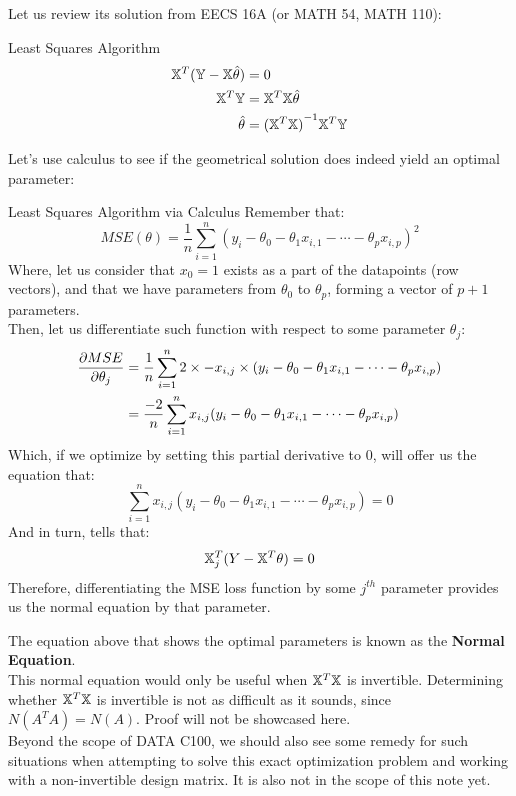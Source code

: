 Let us review its solution from EECS 16A (or MATH 54, MATH 110):
\begin{ln-derive}{Least Squares Algorithm}{}
    \begin{align*}
        \mathbb{X}^T (\mathbb{Y} - \mathbb{X} \hat{\theta}) &= 0 \\
        \mathbb{X}^T\mathbb{Y} &= \mathbb{X}^T\mathbb{X} \hat{\theta} \\
        \hat{\theta} &= {(\mathbb{X}^T\mathbb{X})}^{-1} \mathbb{X}^T\mathbb{Y}
    \end{align*}
\end{ln-derive}
Let's use calculus to see if the geometrical solution does indeed yield an optimal parameter:
\begin{ln-derive}{Least Squares Algorithm via Calculus}{}
    Remember that:
    \[
        MSE(\theta) = \frac{1}{n} \sum_{i = 1}^n {(y_i - \theta_0 - \theta_1 x_{i, 1} - \cdots - \theta_p x_{i, p})}^2
    \]
    Where, let us consider that $x_0 = 1$ exists as a part of the datapoints (row vectors), and that we have parameters from $\theta_0$ to $\theta_p$, forming a vector of $p + 1$ parameters. \\
    Then, let us differentiate such function with respect to some parameter $\theta_j$:
    \begin{align*}
        \pdv{MSE}{\theta_j}(\theta)
        &= \frac{1}{n} \sum_{i = 1}^n 2 \times -x_{i, j} \times (y_i - \theta_0 - \theta_1 x_{i, 1} - \cdots - \theta_p x_{i, p}) \\
        &= \frac{-2}{n} \sum_{i = 1}^n x_{i, j}(y_i - \theta_0 - \theta_1 x_{i, 1} - \cdots - \theta_p x_{i, p}) \\
    \end{align*}
    Which, if we optimize by setting this partial derivative to $0$, will offer us the equation that:
    \[
        \sum_{i = 1}^n x_{i, j}(y_i - \theta_0 - \theta_1 x_{i, 1} - \cdots - \theta_p x_{i, p}) = 0
    \]
    And in turn, tells that:
    \[
        \mathbb{X}_j^T (Y - \mathbb{X}^T \theta) = 0
    \]
    Therefore, differentiating the MSE loss function by some $j^{th}$ parameter provides us the normal equation by that parameter.
\end{ln-derive}
The equation above that shows the optimal parameters is known as the \textbf{Normal Equation}. \\
This normal equation would only be useful when $\mathbb{X}^T \mathbb{X}$ is invertible. Determining whether $\mathbb{X}^T \mathbb{X}$ is invertible is not as difficult as it sounds, since $N(A^T A) = N(A)$. Proof will not be showcased here. \\
Beyond the scope of DATA C100, we should also see some remedy for such situations when attempting to solve this exact optimization problem and working with a non-invertible design matrix. It is also not in the scope of this note yet.

